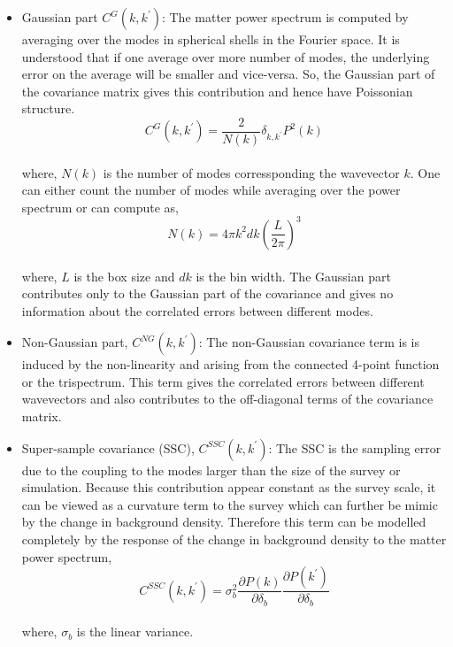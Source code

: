 \begin{itemize}
	\item Gaussian part $C^{G}(k,k^{\prime})$: The matter power spectrum is computed
			by averaging over the modes in spherical shells in the Fourier space. It 
			is understood that if one average over more number of modes, the underlying
			error on the average will be smaller and vice-versa. So, the Gaussian part
			of the covariance matrix gives this contribution and hence have Poissonian
			structure. 
			\begin{equation}
				C^{G}(k,k^{\prime}) = \dfrac{2}{N(k)} \delta_{k,k^{\prime}} P^2(k)
			\end{equation}
			\\
			where, $N(k)$ is the number of modes corressponding the wavevector $k$. One 
			can either count the number of modes while averaging over the power spectrum
			or can compute as,
			\begin{equation}
				N(k) = 4 \pi k^2 dk \left( \dfrac{L}{2\pi} \right)^3
			\end{equation}
			\\
			where, $L$ is the box size and $dk$ is the bin width. The Gaussian part 
			contributes only to the Gaussian part of the covariance and gives no 
			information about the correlated errors between different modes. 

	\item Non-Gaussian part, $C^{NG}(k,k^{\prime})$: The non-Gaussian covariance term is 
			is induced by the non-linearity and arising from the connected 4-point function or the trispectrum. This term gives the correlated errors between
			different wavevectors and also contributes to the off-diagonal terms
			of the covariance matrix. 

	\item Super-sample covariance (SSC), $C^{SSC}(k,k^{\prime})$: The SSC is the sampling
			error due to the coupling to the modes larger than the size of the survey or
			simulation. Because this contribution appear constant as the survey scale, it 
			can be viewed as a curvature term to the survey which can further be mimic
			by the change in background density. Therefore this term can be modelled
			completely by the response of the change in background density to the
			matter power spectrum,
			\begin{equation}
				C^{SSC}(k,k^{\prime}) = \sigma_b^2 \dfrac{\partial P(k)}{\partial \delta_b}
										\dfrac{\partial P(k^{\prime})}{\partial \delta_b}
			\end{equation}
			\\
			where, $\sigma_b$ is the linear variance. 
\end{itemize}

